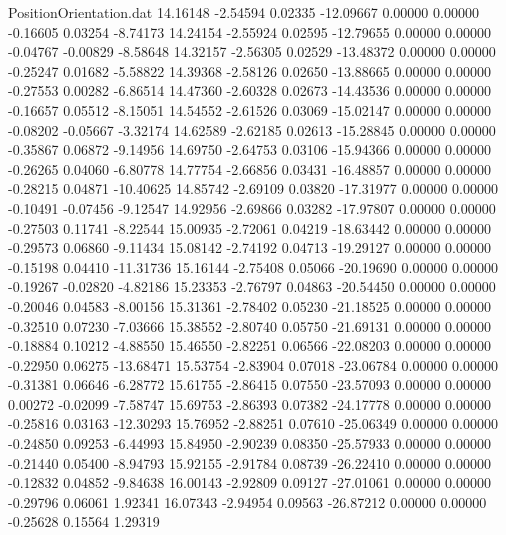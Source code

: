 \begin{filecontents}{PositionOrientation.dat}
  14.16148   -2.54594    0.02335   -12.09667    0.00000    0.00000   -0.16605    0.03254   -8.74173
  14.24154   -2.55924    0.02595   -12.79655    0.00000    0.00000   -0.04767   -0.00829   -8.58648
  14.32157   -2.56305    0.02529   -13.48372    0.00000    0.00000   -0.25247    0.01682   -5.58822
  14.39368   -2.58126    0.02650   -13.88665    0.00000    0.00000   -0.27553    0.00282   -6.86514
  14.47360   -2.60328    0.02673   -14.43536    0.00000    0.00000   -0.16657    0.05512   -8.15051
  14.54552   -2.61526    0.03069   -15.02147    0.00000    0.00000   -0.08202   -0.05667   -3.32174
  14.62589   -2.62185    0.02613   -15.28845    0.00000    0.00000   -0.35867    0.06872   -9.14956
  14.69750   -2.64753    0.03106   -15.94366    0.00000    0.00000   -0.26265    0.04060   -6.80778
  14.77754   -2.66856    0.03431   -16.48857    0.00000    0.00000   -0.28215    0.04871  -10.40625
  14.85742   -2.69109    0.03820   -17.31977    0.00000    0.00000   -0.10491   -0.07456   -9.12547
  14.92956   -2.69866    0.03282   -17.97807    0.00000    0.00000   -0.27503    0.11741   -8.22544
  15.00935   -2.72061    0.04219   -18.63442    0.00000    0.00000   -0.29573    0.06860   -9.11434
  15.08142   -2.74192    0.04713   -19.29127    0.00000    0.00000   -0.15198    0.04410  -11.31736
  15.16144   -2.75408    0.05066   -20.19690    0.00000    0.00000   -0.19267   -0.02820   -4.82186
  15.23353   -2.76797    0.04863   -20.54450    0.00000    0.00000   -0.20046    0.04583   -8.00156
  15.31361   -2.78402    0.05230   -21.18525    0.00000    0.00000   -0.32510    0.07230   -7.03666
  15.38552   -2.80740    0.05750   -21.69131    0.00000    0.00000   -0.18884    0.10212   -4.88550
  15.46550   -2.82251    0.06566   -22.08203    0.00000    0.00000   -0.22950    0.06275  -13.68471
  15.53754   -2.83904    0.07018   -23.06784    0.00000    0.00000   -0.31381    0.06646   -6.28772
  15.61755   -2.86415    0.07550   -23.57093    0.00000    0.00000    0.00272   -0.02099   -7.58747
  15.69753   -2.86393    0.07382   -24.17778    0.00000    0.00000   -0.25816    0.03163  -12.30293
  15.76952   -2.88251    0.07610   -25.06349    0.00000    0.00000   -0.24850    0.09253   -6.44993
  15.84950   -2.90239    0.08350   -25.57933    0.00000    0.00000   -0.21440    0.05400   -8.94793
  15.92155   -2.91784    0.08739   -26.22410    0.00000    0.00000   -0.12832    0.04852   -9.84638
  16.00143   -2.92809    0.09127   -27.01061    0.00000    0.00000   -0.29796    0.06061    1.92341
  16.07343   -2.94954    0.09563   -26.87212    0.00000    0.00000   -0.25628    0.15564    1.29319

\end{filecontents}
